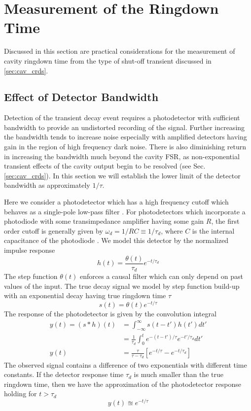 \documentclass[12pt]{report}
\begin{document}
	\section{Measurement of the Ringdown Time}
	Discussed in this section are practical considerations for the measurement of cavity ringdown time from the type of shut-off transient discussed in \ref{sec:cav_crds}.
	
	\subsection{Effect of Detector Bandwidth} \label{sec:crds_detBandwidth}
	Detection of the transient decay event requires a photodetector with sufficient bandwidth to provide an undistorted recording of the signal. Further increasing the bandwidth tends to increase noise especially with amplified detectors having gain in the region of high frequency dark noise. There is also diminishing return in increasing the bandwidth much beyond the cavity FSR, as non-exponential transient effects of the cavity output begin to be resolved (see Sec. \ref{sec:cav_crds}). In this section we will establish the lower limit of the detector bandwidth as approximately $1/\tau$.
	
	Here we consider a photodetector which has a high frequency cutoff which behaves as a single-pole low-pass filter \cite{Su_analogFilters}. For photodetectors which incorporate a photodiode with some transimpedance amplifier having some gain $R$, the first order cutoff is generally given by $\omega_d = 1/RC \equiv 1/\tau_d$, where $C$ is the internal capacitance of the photodiode \cite{Horowitz_ArtOfElectronics}. We model this detector by the normalized impulse response
	\begin{equation}
		h(t) = \frac{\theta(t)}{\tau_d}e^{-t/\tau_d}
	\end{equation}
	The step function $\theta(t)$ enforces a causal filter which can only depend on past values of the input. The true decay signal we model by step function build-up with an exponential decay having true ringdown time $\tau$
	\begin{equation}
		s(t) = \theta(t) e^{-t/\tau}
	\end{equation}
	The response of the photodetector is given by the convolution integral
	\begin{align}
		y(t) = (s*h)(t) &= \int_{-\infty}^{\infty}s(t-t')h(t')dt' \\
		&= \frac{1}{\tau_d}\int_{0}^{t}e^{-(t-t')/\tau}e^{-t'/\tau_d}dt' \\
		y(t) &= \frac{\tau}{\tau - \tau_d}\left[e^{-t/\tau} - e^{-t/\tau_d}\right]
	\end{align}
	The observed signal contains a difference of two exponentials with different time constants. If the detector response time $\tau_d$ is much smaller than the true ringdown time, then we have the approximation of the photodetector response holding for $t>\tau_d$
	\begin{equation}
		y(t) \approxeq e^{-t/\tau}
	\end{equation}
	
\end{document}
